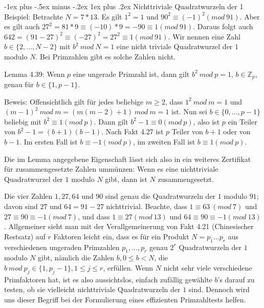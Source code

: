\documentclass[a4paper]{article}
\makeatletter
\renewcommand{\subsubsection}{\@startsection{subsubsection}{3}{0mm}%
 {-1ex plus -.5ex minus -.2ex}%
 {1ex plus .2ex}%
 {\normalfont\small\bfseries}}
\makeatother
\begin{document}
\begin{multicols}{3}
        \subsubsection{Nichttriviale Quadratwurzeln der 1}
        Beispiel: Betrachte $N=7*13$. Es gilt $1^2 = 1$ und $90^2 \equiv(-1)^2 (mod\ 91)$. Aber es gilt auch $27^2 = 81* 9 \equiv(-10)*9 = -90\equiv 1(mod\ 91)$. Daraus folgt auch
    $642 =(91-27)^2 \equiv (-27)^2 = 27^2 \equiv 1 (mod\ 91)$. Wir nennen eine Zahl $b\in\{2,...,N-2\}$ mit $b^2\ mod\ N=1$ eine nicht triviale Quadratwurzel der $1$ modulo $N$. Bei Primzahlen gibt es solche Zahlen nicht.

        Lemma 4.39: Wenn $p$ eine ungerade Primzahl ist, dann gilt $b^2\ mod\ p = 1$, $b \in\mathbb{Z}_p$, genau für $b\in\{1 ,p-1\}$.

        Beweis: Offensichtlich gilt für jedes beliebige $m\geq 2$, dass $1^2\ mod\ m= 1$ und $(m-1)^2\ mod\ m= (m(m-2)+1)\ mod\ m= 1$ ist. Nun sei $b\in\{0 ,...,p-1\}$ beliebig mit $b^2\equiv 1(mod\ p)$. Dann gilt $b^2-1 \equiv 0 (mod\ p)$, also ist $p$ ein Teiler von $b^2-1 =(b+1)(b-1)$. Nach Fakt 4.27 ist $p$ Teiler von $b+1$ oder von $b-1$. Im ersten Fall ist $b\equiv -1 (mod\ p)$, im zweiten Fall ist $b\equiv 1(mod\ p)$.

        Die im Lemma angegebene Eigenschaft lässt sich also in ein weiteres Zertifikat für zusammengesetzte Zahlen ummünzen:
        Wenn es eine nichttriviale Quadratwurzel der $1$ modulo $N$ gibt, dann ist $N$ zusammengesetzt.

        Die vier Zahlen $1, 27, 64$ und $90$ sind genau die Quadratwurzeln der $1$ modulo $91$; davon sind $27$ und $64 = 91-27$ nichttrivial. Beachte, dass $1\equiv 63\ (mod\ 7)$ und $27\equiv 90 \equiv -1(mod\ 7)$, und dass $1\equiv 27 (mod\ 13)$ und $64\equiv 90 \equiv -1 (mod\ 13)$. Allgemeiner sieht man mit der Verallgemeinerung von Fakt 4.21 (Chinesischer Restsatz) auf $r$ Faktoren leicht ein, dass es für ein Produkt $N=p_1...p_r$ aus verschiedenen ungeraden Primzahlen $p_1,...,p_r$ genau $2^r$ Quadratwurzeln der $1$ modulo $N$ gibt, nämlich die Zahlen $b,0\leq b < N$, die $b\ mod\ p_j\in\{1 ,p_j-1\}, 1\leq j\leq r$, erfüllen. Wenn $N$ nicht sehr viele verschiedene Primfaktoren hat, ist es also aussichtslos, einfach zufällig gewählte $b$’s darauf zu testen, ob sie vielleicht nichttriviale Quadratwurzeln der $1$ sind. Dennoch wird uns dieser Begriff bei der Formulierung eines effizienten Primzahltests helfen.


\end{multicols}
\end{document}
